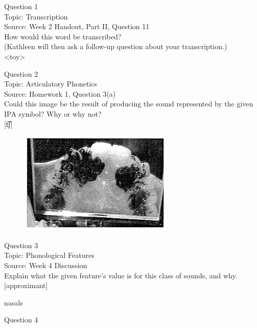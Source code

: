 \documentclass[12pt]{article}
\begin{document}
{\large Question 1}\\

Topic: Transcription\\
Source: Week 2 Handout, Part II, Question 11\\

How would this word be transcribed?\\ (Kathleen will then ask a follow-up question about your transcription.)\\

<toy>


\newpage

{\large Question 2}\\

Topic: Articulatory Phonetics\\
Source: Homework 1, Question 3(a)\\

Could this image be the result of producing the sound represented by the given IPA symbol? Why or why not?\\

{[t͡ʃ]}

\begin{figure}[H]
\includegraphics{../images/staticpalatography_fricative.png}
\end{figure}

\newpage

{\large Question 3}\\

Topic: Phonological Features\\
Source: Week 4 Discussion\\

Explain what the given feature’s value is for this class of sounds, and why.\\

{[approximant]}

nasals


\newpage

{\large Question 4}\\
\end{document}
